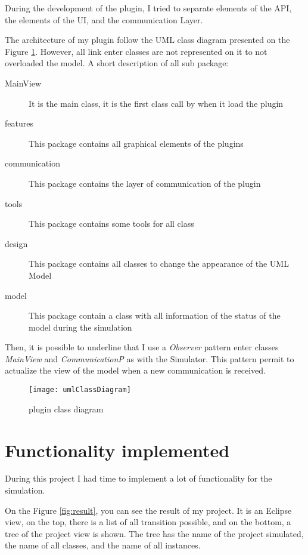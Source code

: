 During the development of the plugin, I tried to separate elements of the \umld API, the elements of the UI, and the communication Layer.

The architecture of my plugin follow the UML class diagram presented on the Figure \ref{fig:classDiagram}. However, all link enter classes are not represented on it to not overloaded the model. A short description of all sub package:

\noitemsep
\begin{description}
\item[MainView] It is the main class, it is the first class call by \umld when it load the plugin
\item[features] This package contains all graphical elements of the plugins
\item[communication] This package contains the layer of communication of the plugin
\item[tools] This package contains some tools for all class
\item[design] This package contains all classes to change the appearance of the UML Model
\item[model] This package contain a class with all information of the status of the model during the simulation
\end{description}
\doitemsep

Then, it is possible to underline that I use a \textit{Observer} pattern enter classes \textit{MainView} and \textit{CommunicationP} as with the Simulator. This pattern permit to actualize the view of the model when a new communication is received.

\begin{figure}[h]
  \centering
  \texttt{[image: umlClassDiagram]}
  \caption{plugin class diagram}
  \label{fig:classDiagram}
\end{figure}



\section{Functionality implemented}

During this project I had time to implement a lot of functionality for the simulation.


On the Figure \ref{fig:result}, you can see the result of my project. It is an Eclipse view, on the top, there is a list of all transition possible, and on the bottom, a tree of the project view is shown. The tree has the name of the project simulated, the name of all classes, and the name of all instances.

